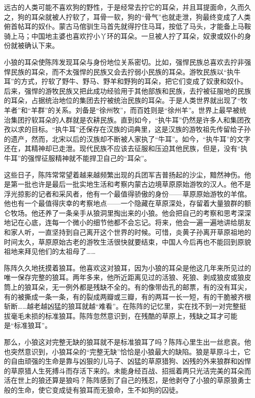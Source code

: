 \par 远古的人类可能不喜欢狗的野性，于是经常去拧它的耳朵，并且耳提面命，久而久之，狗的耳朵就被人拧软了，耳骨一软，狗的“骨气”也就走泄，狗最终变成了人类俯首帖耳的奴仆。蒙古马倌驯生马首先就得拧住马耳，按低了马头，才能备上马鞍骑上马；中国地主婆也喜欢拧小丫环的耳朵。一旦被人拧了耳朵，奴隶或奴仆的身份就被确认下来。
\par 小狼的耳朵使陈阵发现耳朵与身份地位关系密切。比如，强悍民族总喜欢去拧非强悍民族的耳朵，而不太强悍的民族又会去拧弱小民族的耳朵。游牧民族以“执牛耳”的方式，拧软了野牛、野马、野羊和野狗的耳朵，把它们变成了奴隶和奴仆。后来，强悍的游牧民族又把此成功经验用于其他部族和民族，去拧被征服地的民族的耳朵，占据统治地位的集团去拧被统治民族的耳朵。于是人类世界就出现了“牧羊者”和“羊群”的关系。刘备是“徐州牧”，而百姓则是“徐州羊”。世界上最早被统治集团拧软耳朵的人群就是农耕民族。直到如今，“执牛耳”仍然是许多人和集团孜孜以求的目标。“执牛耳”还保存在汉族的词典里，这是汉族的游牧祖先传留给子孙的遗产，然而，北宋以后的汉族却不断被人家执了“牛耳”。如今，“执牛耳”的文字还在，其精神却已走泄。现代民族不应该去征服和压迫其他民族，但是，没有“执牛耳”的强悍征服精神就不能捍卫自己的“耳朵”。
\par 这些日子，陈阵常常望着越来越频繁出现的兵团军吉普扬起的沙尘，黯然神伤。他是第一批也许是最后一批实地生活和考察内蒙古边境草原原始游牧的汉人。他不是浮光掠影的记者和采风者，他有一个最值得骄傲的身份——草原原始游牧的羊倌。他也有一个最值得庆幸的考察地点——一个隐藏在草原深处，存留着大量狼群的额仑牧场。他还养了一条亲手从狼洞里掏出来的小狼。他会把自己的考察和思考深深地记在心底，连每一个微小的细节他都不会忘记。将来，他会一遍一遍地讲给朋友和家人听，一直坚持到自己离开这个世界的时候。可惜，炎黄子孙离开草原祖地的时间太久，草原原始古老的游牧生活很快就要结束，中国人今后再也不能回到原貌祖地来拜见他们的太祖母了……
\par 陈阵久久地抚摸着狼耳。他喜欢这对狼耳，因为小狼的耳朵是他这几年来所见过的唯一保存完整的狼耳。两年多来，他所近距离见过的活狼、死狼、剥成狼皮或狼皮筒上的狼耳朵，无一例外都是残缺不全的。有的像带齿孔的邮票，有的没有耳尖，有的被撕成一条一条，有的裂成两瓣或三瓣，有的两耳一长一短，有的干脆被齐根斩断……越老越凶猛的狼耳就越“难看”。在陈阵的记忆里，实在找不到一对完整挺拔毫毛未损的标准狼耳。陈阵忽然意识到，在残酷的草原上，残缺之耳才可能是“标准狼耳”。
\par 那么，小狼这对完整无缺的狼耳就不是标准狼耳了吗？陈阵心里生出一丝悲哀。他也突然意识到，小狼耳朵的“完整无缺”恰恰是小狼最大的缺陷。狼是草原斗士，它的自由顽强的生命是靠与凶狠的儿马子、凶猛的草原猎狗、凶残的外来狼群和凶悍的草原猎人生死搏斗而存活下来的。未能身经百战、招摇着两只光洁完美的耳朵而活在世上的狼还算是狼吗？陈阵感到了自己的残忍，是他剥夺了小狼的草原狼勇士般的生命，使它变成徒有狼耳而无狼命，生不如狗的囚徒。
